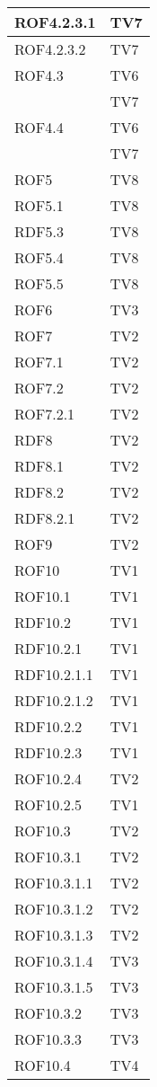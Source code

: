 \begin{center}
\begin{longtable}{|p{7cm}|p{7cm}|}
ROF4.2.3.1 & TV7\\
\midrule
ROF4.2.3.2 & TV7\\
\midrule
ROF4.3 & TV6\\ & TV7\\
\midrule
ROF4.4 & TV6\\ & TV7\\
\midrule
ROF5 & TV8\\
\midrule
ROF5.1 & TV8\\
\midrule
RDF5.3 & TV8\\
\midrule
ROF5.4 & TV8\\
\midrule
ROF5.5 & TV8\\
\midrule
ROF6 & TV3\\
\midrule
ROF7 & TV2\\
\midrule
ROF7.1 & TV2\\
\midrule
ROF7.2 & TV2\\
\midrule
ROF7.2.1 & TV2\\
\midrule
RDF8 & TV2\\
\midrule
RDF8.1 & TV2\\
\midrule
RDF8.2 & TV2\\
\midrule
RDF8.2.1 & TV2\\
\midrule
ROF9 & TV2\\
\midrule
ROF10 & TV1\\
\midrule
ROF10.1 & TV1\\
\midrule
RDF10.2 & TV1\\
\midrule
RDF10.2.1 & TV1\\
\midrule
RDF10.2.1.1 & TV1\\
\midrule
RDF10.2.1.2 & TV1\\
\midrule
RDF10.2.2 & TV1\\
\midrule
RDF10.2.3 & TV1\\
\midrule
ROF10.2.4 & TV2\\
\midrule
ROF10.2.5 & TV1\\
\midrule
ROF10.3 & TV2\\
\midrule
ROF10.3.1 & TV2\\
\midrule
ROF10.3.1.1 & TV2\\
\midrule
ROF10.3.1.2 & TV2\\
\midrule
ROF10.3.1.3 & TV2\\
\midrule
ROF10.3.1.4 & TV3\\
\midrule
ROF10.3.1.5 & TV3\\
\midrule
ROF10.3.2 & TV3\\
\midrule
ROF10.3.3 & TV3\\
\midrule
ROF10.4 & TV4\\

\end{longtable}
\end{center}
